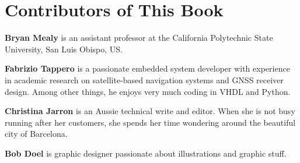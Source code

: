%
%
%
\chapter*{Contributors of This Book}

\noindent
\textbf{Bryan Mealy} is an assistant professor at the California Polytechnic State University, San Luis Obispo, US.

\noindent
\textbf{Fabrizio Tappero} is a passionate embedded system developer with experience in academic research on satellite-based navigation systems and GNSS receiver design. Among other things, he enjoys very much coding in VHDL and Python.

\noindent
\textbf{Christina Jarron} is an Aussie technical write and editor. When she is not busy running after her customers, she spends her time wondering around the beautiful city of Barcelona. 

\noindent
\textbf{Bob Doel} is graphic designer passionate about illustrations and graphic stuff.
